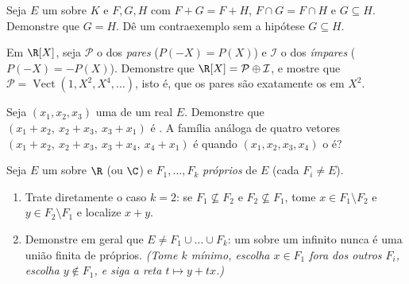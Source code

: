 \begin{exercise}[$\star\star\star$]\label{exo:b1:vspaces:9}
Seja $E$ um  sobre $K$ e $F, G, H$  com
$F + G =
F + H$, $F \cap G = F \cap H$ e $G \subseteq H$. Demonstre que $G = H$.
Dê um contraexemplo sem a hipótese $G \subseteq H$.
\end{exercise}

\begin{exercise}[$\star\star$]\label{exo:b1:vspaces:10}
Em $\R[X]$, seja $\mathcal P$ o  dos  \emph{pares}
($P(-X) = P(X)$) e $\mathcal I$ o  dos \emph{ímpares}
($P(-X) = -P(X)$). Demonstre que $\R[X] = \mathcal P \oplus \mathcal
I$, e mostre que $\mathcal P =
\operatorname{Vect}(1, X^2, X^4, \dots)$, isto é, que os
 pares são exatamente os  em $X^2$.
\end{exercise}

\begin{exercise}[$\star\star$]\label{exo:b1:vspaces:11}
Seja $(x_1, x_2, x_3)$ uma  de um  real $E$.
Demonstre que $(x_1 + x_2,\ x_2 + x_3,\ x_3 + x_1)$ é . A família análoga de quatro vetores
$(x_1 + x_2,\ x_2 + x_3,\ x_3 +
x_4,\ x_4 + x_1)$ é  quando $(x_1, x_2, x_3, x_4)$ o é?
\end{exercise}

\begin{exercise}[$\star\star\star$]\label{exo:b1:vspaces:12}
Seja $E$ um  sobre $\R$ (ou $\C$) e $F_1, \dots,
F_k$
 \emph{próprios} de $E$ (cada $F_i \neq E$).
\begin{enumerate}
  \item Trate diretamente o caso $k = 2$: se $F_1 \not\subseteq
        F_2$ e $F_2 \not\subseteq F_1$, tome
        $x \in F_1
        \setminus F_2$ e $y \in F_2 \setminus F_1$ e localize $x
        + y$.
  \item Demonstre em geral que $E \neq F_1 \cup \dots \cup F_k$: um
         sobre um  infinito nunca é uma união
        finita de  próprios. \emph{(Tome $k$ mínimo,
        escolha $x \in F_1$ fora dos outros $F_i$, escolha $y \notin F_1$,
        e siga a reta $t \mapsto y + tx$.)}
\end{enumerate}
\end{exercise}

